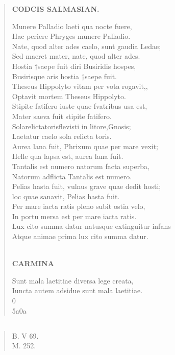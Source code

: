 \documentclass[11pt, a4paper]{report}
\begin{document}
\begin{verse}
    \begin{center} \textbf{CODCIS SALMASIAN.} \end{center} \marginpar{[193]} Munere Palladio laeti qua nocte fuere, \\ Hac periere Phryges munere Palladio. \\ Nate, quod alter ades caelo, sunt gaudia Ledae; \\ Sed maeret mater, nate, quod alter ades. \\ Hostia †saepe fuit diri Busiridis hospes, \\ Busirisque aris hostia †saepe fuit. \\ Theseus Hippolyto vitam per vota rogavit,, \\ Optavit mortem Theseus Hippolyto. \\ Stipite fatifero iuste quae fvatribus usa est, \\ Mater saeva fuit stipite fatifero. \\ Solarelictatorisflevisti \lbrack in \rbrack litore,Gnosis; \\ Laetatur caelo sola relicta toris. \\ Aurea lana fuit, Phrixum quae per mare vexit; \\ Helle qua lapsa est, aurea lana fuit. \\ Tantalis est numero natorum facta superba, \\ Natorum adflicta Tantalis est numero. \\ Pelias hasta fuit, vulnus grave quae dedit hosti; \\ loc quae sanavit, Pelias hasta fuit. \\ Per mare iacta ratis pleno subit ostia velo, \\ In portu mersa est per mare iacta ratis. \\ Lux cito summa datur natusque extinguitur infans \\ Atque animae prima lux cito summa datur. \\ 
        ﻿\pagebreak 
    \begin{center} \textbf{CARMINA} \end{center} \marginpar{[194]} Sunt mala laetitiae diversa lege creata, \\ Iuncta autem adsidue sunt mala laetitiae. \\ 0 \\ 5a0a \\ 
      \end{verse}
  
            \subsection*{}
      \begin{verse}
      B. V 69. \\ M. 252. \\ 
      \end{verse}
  
\end{document}
